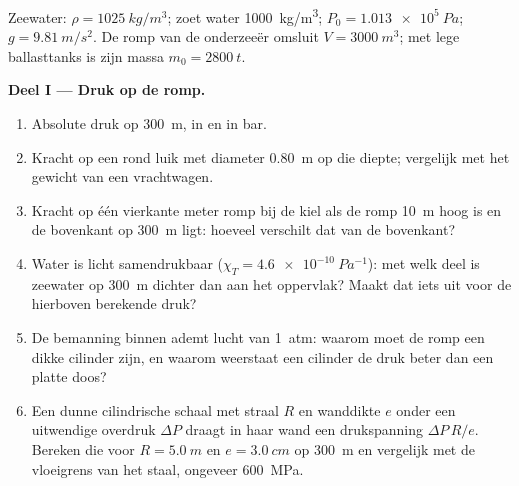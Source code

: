 \begin{problem}
\label{pb:b1:fluid-statics:1}
Zeewater: $\rho = \qty{1025}{kg/m^3}$; zoet water \qty{1000}{kg/m^3};
$P_0 = \qty{1.013e5}{Pa}$; $g = \qty{9.81}{m/s^2}$. De romp van de onderzeeër
omsluit $V = \qty{3000}{m^3}$; met lege ballasttanks is zijn massa
$m_0 = \qty{2800}{t}$.

\medskip
\noindent\textbf{Deel I --- Druk op de romp.}
\begin{enumerate}
  \item Absolute druk op \qty{300}{m}, in  en in bar.
  \item Kracht op een rond luik met diameter \qty{0.80}{m} op die diepte;
        vergelijk met het gewicht van een vrachtwagen.
  \item Kracht op één vierkante meter romp bij de kiel als de romp
        \qty{10}{m} hoog is en de bovenkant op \qty{300}{m} ligt: hoeveel verschilt
        dat van de bovenkant?
  \item Water is licht samendrukbaar ($\chi_T = \qty{4.6e-10}{Pa^{-1}}$):
        met welk deel is zeewater op \qty{300}{m} dichter dan aan het
        oppervlak? Maakt dat iets uit voor de hierboven berekende druk?
  \item De bemanning binnen ademt lucht van \qty{1}{atm}: waarom moet de romp
        een dikke cilinder zijn, en waarom weerstaat een cilinder de druk
        beter dan een platte doos?
  \item Een dunne cilindrische schaal met straal $R$ en wanddikte $e$
        onder een uitwendige overdruk $\Delta P$ draagt in haar wand een
        drukspanning $\Delta P\,R/e$. Bereken die voor $R = \qty{5.0}{m}$ en
        $e = \qty{3.0}{cm}$ op \qty{300}{m} en vergelijk met de
        vloeigrens van het staal, ongeveer \qty{600}{MPa}.
\end{enumerate}


\end{problem}
